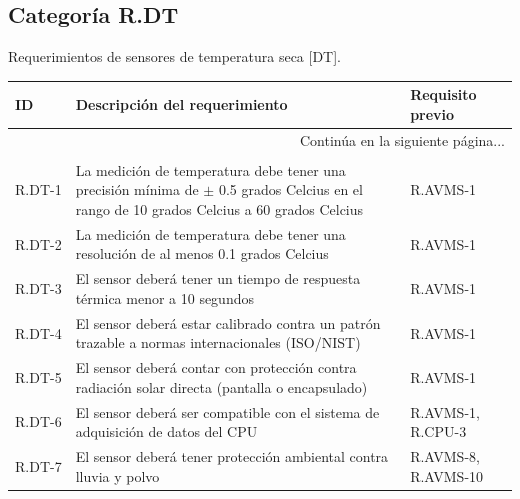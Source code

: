 \documentclass{article}%
\begin{document}
\subsection{Categoría R.DT}%
\label{subsec:CategoraR.DT}%
Requerimientos de sensores de temperatura seca [DT].\newline%
\newline%
%
\begin{longtable}{|p{2cm}|p{9cm}|p{2.5cm}|}%
\hline%
ID&Descripción del requerimiento&Requisito previo\\%
\hline%
\endhead%
\hline%
\multicolumn{3}{|r|}{Continúa en la siguiente página...}\\%
\hline%
\endfoot%
\hline%
\multicolumn{3}{|r|}{Fin de la tabla}\\%
\hline%
\endlastfoot%
R.DT{-}1& La medición de temperatura debe tener una precisión mínima de $\pm$ 0.5 grados Celcius en el rango de 10 grados Celcius a 60 grados Celcius&R.AVMS{-}1\\%
\hline%
R.DT{-}2& La medición de temperatura debe tener una resolución de al menos 0.1 grados Celcius&R.AVMS{-}1\\%
\hline%
R.DT{-}3& El sensor deberá tener un tiempo de respuesta térmica menor a 10 segundos& R.AVMS{-}1\\%
\hline%
R.DT{-}4& El sensor deberá estar calibrado contra un patrón trazable a normas internacionales (ISO/NIST)& R.AVMS{-}1\\%
\hline%
R.DT{-}5& El sensor deberá contar con protección contra radiación solar directa (pantalla o encapsulado)& R.AVMS{-}1\\%
\hline%
R.DT{-}6& El sensor deberá ser compatible con el sistema de adquisición de datos del CPU& R.AVMS{-}1, R.CPU{-}3\\%
\hline%
R.DT{-}7& El sensor deberá tener protección ambiental contra lluvia y polvo& R.AVMS{-}8, R.AVMS{-}10\\%
\hline%
\end{longtable}

%
\newpage%
\end{document}
